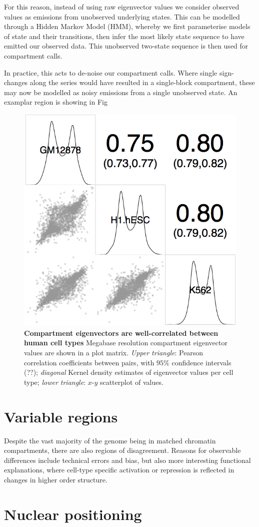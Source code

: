 \documentclass[a4paper,10pt,oneside]{book}
\begin{document}
For this reason, instead of using raw eigenvector values we consider observed values as emissions from unobserved underlying states. This can be modelled through a Hidden Markov Model (HMM), whereby we first parameterise models of state and their transitions, then infer the most likely state sequence to have emitted our observed data. This unobserved two-state sequence is then used for compartment calls. 

In practice, this acts to de-noise our compartment calls. Where single sign-changes along the series would have resulted in a single-block compartment, these may now be modelled as noisy emissions from a single unobserved state. An examplar region is showing in Fig 

\begin{figure}
\begin{center}
\includegraphics[width=.5\textwidth]{figs/compartment_corr.png}
\captionsetup{width=\textwidth}
\caption{
{\bf Compartment eigenvectors are well-correlated between human cell types}
Megabase resolution compartment eigenvector values are shown in a plot matrix. \emph{Upper triangle}: Pearson correlation coefficients between pairs, with $95\%$ confidence intervals (??); \emph{diagonal} Kernel density estimates of eigenvector values per cell type; \emph{lower triangle}: $x$-$y$ scatterplot of values.
}\label{fig:compcor}
\end{center}
\end{figure} 


\section{Variable regions}

Despite the vast majority of the genome being in matched chromatin compartments, there are also regions of disagreement. Reasons for observable differences include technical errors and bias, but also more interesting functional explanations, where cell-type specific activation or repression is reflected in changes in higher order structure.









\section{Nuclear positioning}



\begin{small}

\end{small}
\end{document}

